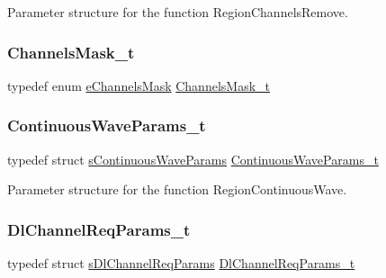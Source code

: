 Parameter structure for the function Region\+Channels\+Remove. \mbox{\label{group___r_e_g_i_o_n_ga933f695eea70935418e2175940b92311}} 
\subsubsection{\texorpdfstring{Channels\+Mask\+\_\+t}{ChannelsMask\_t}}
{\footnotesize\ttfamily typedef enum \mbox{\hyperlink{group___r_e_g_i_o_n_ga7a62e669f567fc160ad58210664bca9c}{e\+Channels\+Mask}} \mbox{\hyperlink{group___r_e_g_i_o_n_ga933f695eea70935418e2175940b92311}{Channels\+Mask\+\_\+t}}}

\mbox{\label{group___r_e_g_i_o_n_gaf39bb5ba06921139c6d17f88a8d518cd}} 
\subsubsection{\texorpdfstring{Continuous\+Wave\+Params\+\_\+t}{ContinuousWaveParams\_t}}
{\footnotesize\ttfamily typedef struct \mbox{\hyperlink{structs_continuous_wave_params}{s\+Continuous\+Wave\+Params}} \mbox{\hyperlink{group___r_e_g_i_o_n_gaf39bb5ba06921139c6d17f88a8d518cd}{Continuous\+Wave\+Params\+\_\+t}}}

Parameter structure for the function Region\+Continuous\+Wave. \mbox{\label{group___r_e_g_i_o_n_gae0d608ff1f8ea0a430e4f9a4c38ec7f3}} 
\subsubsection{\texorpdfstring{Dl\+Channel\+Req\+Params\+\_\+t}{DlChannelReqParams\_t}}
{\footnotesize\ttfamily typedef struct \mbox{\hyperlink{structs_dl_channel_req_params}{s\+Dl\+Channel\+Req\+Params}} \mbox{\hyperlink{group___r_e_g_i_o_n_gae0d608ff1f8ea0a430e4f9a4c38ec7f3}{Dl\+Channel\+Req\+Params\+\_\+t}}}

